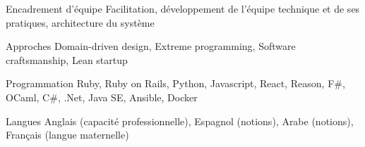 

\begin{cvskills}

  \cvskill
    {Encadrement d'équipe}
    {Facilitation, développement de l'équipe technique et de ses pratiques, architecture du système}

  \cvskill
    {Approches}
    {Domain-driven design, Extreme programming, Software craftsmanship, Lean startup}

  \cvskill
    {Programmation}
    {Ruby, Ruby on Rails, Python, Javascript, React, Reason, F\#, OCaml, C\#, .Net, Java SE, Ansible, Docker}

  \cvskill
    {Langues}
    {Anglais (capacité professionnelle), Espagnol (notions), Arabe (notions), Français (langue maternelle)}

\end{cvskills}
